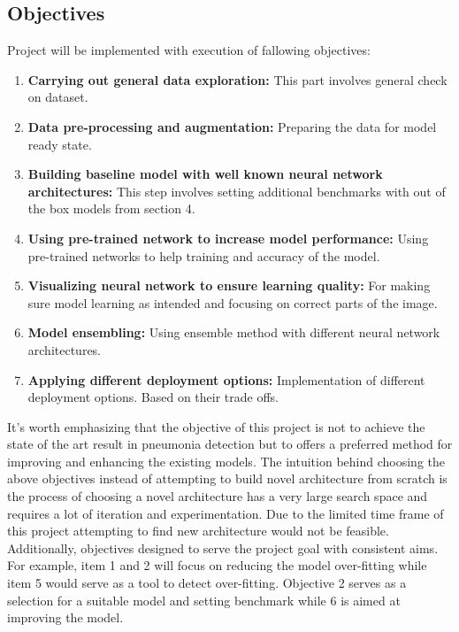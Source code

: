 \subsection{Objectives}
Project will be implemented with execution of fallowing objectives:
\begin{enumerate}
    \item \textbf{Carrying out general data exploration: }This part involves general check on dataset.
    \item \textbf{Data pre-processing and augmentation: }Preparing the data for model ready state.
    \item \textbf{Building baseline model with well known neural network architectures: }This step involves setting additional benchmarks with out of the box models from section 4.
    \item \textbf{Using pre-trained network to increase model performance: }Using pre-trained networks to help training and accuracy of the model.
    \item \textbf{Visualizing neural network to ensure learning quality: } For making sure model learning as intended and focusing on correct parts of the image.
    \item \textbf{Model ensembling: }Using ensemble method with different neural network architectures.
    \item \textbf{Applying different deployment options: } Implementation of different deployment options. Based on their trade offs. 
\end{enumerate}
It's worth emphasizing that the objective of this project is not to achieve the state of the art result in pneumonia detection but to offers a preferred method for improving and enhancing the existing models.
The intuition behind choosing the above objectives instead of attempting to build novel architecture from scratch is the process of choosing a novel architecture has a very large search space and requires a lot of iteration and experimentation. Due to the limited time frame of this project attempting to find new architecture would not be feasible. Additionally, objectives designed to serve the project goal with consistent aims. For example, item 1 and 2 will focus on reducing the model over-fitting while item 5 would serve as a tool to detect over-fitting. Objective 2 serves as a selection for a suitable model and setting benchmark while 6 is aimed at improving the model.

